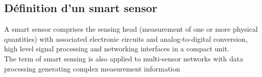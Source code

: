 \documentclass[]{article}
\begin{document}
\begin{multicols}{2}
\subsection{Définition d'un smart sensor}
A smart sensor comprises the sensing head (measurement of one or 
more physical quantities) with associated electronic circuits and 
analog-to-digital conversion, high level signal processing and 
networking interfaces in a compact unit.\\
The term of smart sensing is also applied to multi-sensor networks with data processing generating complex measurement information


\end{multicols}
\end{document}
